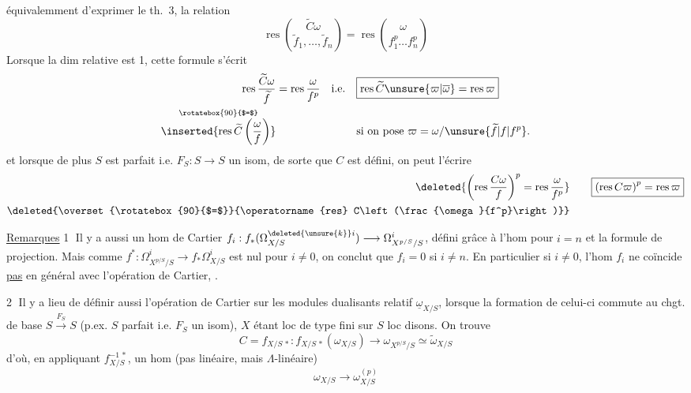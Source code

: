  équivalemment d'exprimer le th.~3, la relation
\[
\boxed{\operatorname{res}\binom{\widetilde C\omega}{\widetilde f_1,\ldots,\widetilde f_n}
 =\operatorname{res}\binom{\omega}{f_1^p\ldots f_n^p}}
\]
Lorsque la dim relative est 1, cette formule s'écrit
\[
\begin{aligned}
\operatorname{res}\frac{\widetilde C\omega}{\widetilde f}
 &=\operatorname{res}\frac{\omega}{f^p}
 &\text{i.e.}\quad &\boxed{\operatorname{res}\widetilde C\unsure{\varpi|\overline\omega}=\operatorname{res}\varpi}\\
\overset{\rotatebox{90}{$=$}}{\inserted{\operatorname{res}\widetilde C\left(\frac{\omega}{f}\right)}}
 &&&\text{si on pose }\varpi=\omega/\unsure{\widetilde f|f|f^p}.
\end{aligned}
\]
et lorsque de plus $S$ est parfait i.e. $F_S:S\longrightarrow S$ un isom, de sorte que $C$ est défini, on peut l'écrire
\[
\begin{aligned}
\deleted{\left(\operatorname{res}\frac{C\omega}{f}\right)^p=\operatorname{res}\frac{\omega}{f^p}}
 &\qquad \boxed{\left(\operatorname{res} C\varpi\right)^p=\operatorname{res}\varpi}\\
\deleted{\overset{\rotatebox{90}{$=$}}{\operatorname{res} C\left(\frac{\omega}{f^p}\right)}}&
\end{aligned}
\]

\uline{Remarques} \textcircled{1} Il y a aussi un hom de Cartier $f_i:f_*(\Omega^{\deleted{\unsure{k}}i}_{X/S})\longrightarrow\Omega^i_{X^{p/S}/S}$, défini grâce à l'hom  pour $i=n$ et la formule de projection. Mais comme $f^\ast:\Omega^i_{X^{p/S}/S}\longrightarrow f_*\Omega^i_{X/S}$ est nul pour $i\ne0$, on conclut que $f_i=0$ si $i\ne n$. En particulier si $i\ne0$, l'hom $f_i$ ne coïncide \uline{pas} en général avec l'opération de Cartier, .

\textcircled{2} Il y a lieu de définir aussi l'opération de Cartier  sur les modules dualisants relatif $\underline{\omega}_{X/S}$,  lorsque la formation de celui-ci commute au chgt. de base $S\xrightarrow{F_S}S$  (p.ex. $S$ parfait i.e. $F_S$ un isom),  $X$ étant loc de type fini sur $S$ loc  disons. On trouve
\[
 C=f_{X/S\,*}:f_{X/S\,*}(\omega_{X/S})\longrightarrow
 \omega_{X^{p/S}/S}\simeq\widetilde\omega_{X/S}
\]
d'où, en appliquant $f_{X/S}^{-1\,*}$,  un hom (pas linéaire, mais $\Lambda$-linéaire)
\[
 \omega_{X/S}\longrightarrow\omega_{X/S}^{(p)}
\]
